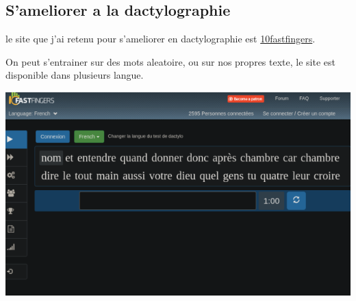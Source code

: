 \documentclass{article}
\begin{document}
 
 \subsection{\large{S'ameliorer a la dactylographie}}
 le site que j'ai retenu pour s'ameliorer en dactylographie est \href{https://10fastfingers.com/typing-test/french}{10fastfingers}. \par On peut s'entrainer sur des mots aleatoire, ou sur nos propres texte, le site est disponible dans plusieurs langue.

\begin{center}
    \includegraphics[scale=0.7]{Images/fastfinger.png}
\end{center}

\end{document}
